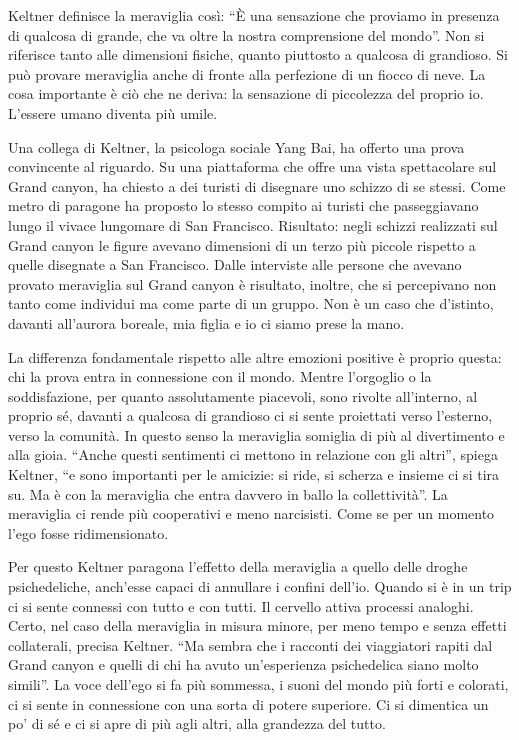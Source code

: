 \documentclass[11pt]{report}
\begin{document}
Keltner definisce la meraviglia così: “È una sensazione che proviamo in presenza di qualcosa di grande, che va oltre la nostra comprensione del mondo”. Non si riferisce tanto alle dimensioni fisiche, quanto piuttosto a qualcosa di grandioso. Si può provare meraviglia anche di fronte alla perfezione di un fiocco di neve. La cosa importante è ciò che ne deriva: la sensazione di piccolezza del proprio io. L’essere umano diventa più umile.


Una collega di Keltner, la psicologa sociale Yang Bai, ha offerto una prova convincente al riguardo. Su una piattaforma che offre una vista spettacolare sul Grand canyon, ha chiesto a dei turisti di disegnare uno schizzo di se stessi. Come metro di paragone ha proposto lo stesso compito ai turisti che passeggiavano lungo il vivace lungomare di San Francisco. Risultato: negli schizzi realizzati sul Grand canyon le figure avevano dimensioni di un terzo più piccole rispetto a quelle disegnate a San Francisco. Dalle interviste alle persone che avevano provato meraviglia sul Grand canyon è risultato, inoltre, che si percepivano non tanto come individui ma come parte di un gruppo. Non è un caso che d’istinto, davanti all’aurora boreale, mia figlia e io ci siamo prese la mano.

La differenza fondamentale rispetto alle altre emozioni positive è proprio questa: chi la prova entra in connessione con il mondo. Mentre l’orgoglio o la soddisfazione, per quanto assolutamente piacevoli, sono rivolte all’interno, al proprio sé, davanti a qualcosa di grandioso ci si sente proiettati verso l’esterno, verso la comunità. In questo senso la meraviglia somiglia di più al divertimento e alla gioia. “Anche questi sentimenti ci mettono in relazione con gli altri”, spiega Keltner, “e sono importanti per le amicizie: si ride, si scherza e insieme ci si tira su. Ma è con la meraviglia che entra davvero in ballo la collettività”. La meraviglia ci rende più cooperativi e meno narcisisti. Come se per un momento l’ego fosse ridimensionato.

Per questo Keltner paragona l’effetto della meraviglia a quello delle droghe psichedeliche, anch’esse capaci di annullare i confini dell’io. Quando si è in un trip ci si sente connessi con tutto e con tutti. Il cervello attiva processi analoghi. Certo, nel caso della meraviglia in misura minore, per meno tempo e senza effetti collaterali, precisa Keltner. “Ma sembra che i racconti dei viaggiatori rapiti dal Grand canyon e quelli di chi ha avuto un’esperienza psichedelica siano molto simili”. La voce dell’ego si fa più sommessa, i suoni del mondo più forti e colorati, ci si sente in connessione con una sorta di potere superiore. Ci si dimentica un po’ di sé e ci si apre di più agli altri, alla grandezza del tutto.
\end{document}
